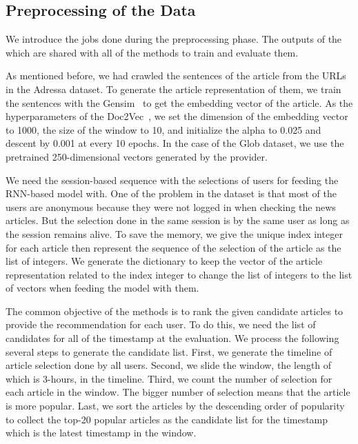 \subsection{Preprocessing of the Data}
\label{sec:exp:preprocess}
We introduce the jobs done during the preprocessing phase.
The outputs of the which are shared with all of the methods to train and evaluate them.

As mentioned before, we had crawled the sentences of the article from the URLs in the Adressa dataset.
To generate the article representation of them, we train the sentences with the Gensim~\cite{Gensim} to get the embedding vector of the article.
As the hyperparameters of the Doc2Vec~\cite{Doc2Vec}, we set the dimension of the embedding vector to 1000, the size of the window to 10, and initialize the alpha to 0.025 and descent by 0.001 at every 10 epochs.
In the case of the Glob dataset, we use the pretrained 250-dimensional vectors generated by the provider.

We need the session-based sequence with the selections of users for feeding the RNN-based model with.
One of the problem in the dataset is that most of the users are anonymous because they were not logged in when checking the news articles.
But the selection done in the same session is by the same user as long as the session remains alive.
To save the memory, we give the unique index integer for each article then represent the sequence of the selection of the article as the list of integers.
We generate the dictionary to keep the vector of the article representation related to the index integer to change the list of integers to the list of vectors when feeding the model with them.

The common objective of the methods is to rank the given candidate articles to provide the recommendation for each user.
To do this, we need the list of candidates for all of the timestamp at the evaluation.
We process the following several steps to generate the candidate list.
First, we generate the timeline of article selection done by all users.
Second, we slide the window, the length of which is 3-hours, in the timeline.
Third, we count the number of selection for each article in the window.
The bigger number of selection means that the article is more popular. 
Last, we sort the articles by the descending order of popularity to collect the top-20 popular articles as the candidate list for the timestamp which is the latest timestamp in the window.

